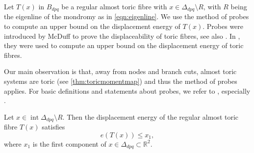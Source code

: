 \documentclass[12pt,a4paper,draft]{scrartcl}
\begin{document}
Let $T(x)$ in $B_{dpq}$ be a regular almost toric fibre with $x \in \Delta_{dpq} \setminus R$, with $R$ being the eigenline of the mondromy as in \eqref{eqn:eigenline}. We use the method of probes to compute an upper bound on the displacement energy of $T(x)$. Probes were introduced by McDuff \cite{mcduff2011displacing} to prove the displaceability of toric fibres, see also \cite{AbrBorMcD14}. In \cite{brendel2020real}, they were used to compute an upper bound on the displacement energy of toric fibres.

Our main observation is that, away from nodes and branch cuts, almost toric systems are toric (see \cref{thm:toricmomentmap}) and thus the method of probes applies.
For basic definitions and statements about probes, we refer to \cite{mcduff2011displacing}, especially \cite[Definition 2.3, Lemma 2.4]{mcduff2011displacing}.


\begin{lemma}
    \label{thm:upper_bound}
    Let $x \in \operatorname{int} \Delta_{dpq} \setminus R$. Then the displacement energy of the regular almost toric fibre $T(x)$ satisfies
    \[ e(T(x))\leq x_1, \]
    where $x_1$ is the first component of $x \in \Delta_{dpq} \subset \mathbb{R}^2$.
\end{lemma}
\end{document}
